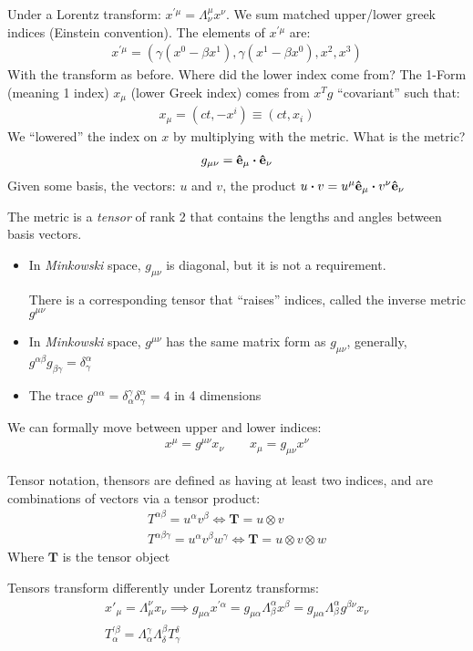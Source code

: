 Under a Lorentz transform: $x^{\prime\mu}=\Lambda^\mu_\nu x^\nu$. We sum matched upper/lower greek indices (Einstein convention). The elements of $x^{\prime\mu}$ are:
\begin{align*}
  x^{\prime\mu}=(\gamma(x^0-\beta x^1),\gamma(x^1-\beta x^0),x^2,x^3)
\end{align*}
With the transform as before. Where did the lower index come from? The 1-Form (meaning 1 index) $x_\mu$ (lower Greek index) comes from $x^Tg$ ``covariant'' such that:
\begin{align*}
  x_\mu=(ct,-x^i)\equiv (ct,x_i)
\end{align*}
We ``lowered'' the index on $x$ by multiplying with the metric. What is the metric?
\begin{align*}
  g_{\mu\nu}=\vu{e}_\mu\vdot\vu{e}_\nu
\end{align*}
Given some basis, the vectors: $u$ and $v$, the product $u\vdot v=u^\mu\vu{e}_\mu\vdot v^\nu\vu{e}_\nu$

\begin{definition}
  The metric is a \emph{tensor} of rank 2 that contains the lengths and angles between basis vectors.
  \begin{itemize}
  \item In \emph{Minkowski} space, $g_{\mu\nu}$ is diagonal, but it is not a requirement.

    There is a corresponding tensor that ``raises'' indices, called the inverse metric $g^{\mu\nu}$
  \item In \emph{Minkowski} space, $g^{\mu\nu}$ has the same matrix form as $g_{\mu\nu}$, generally, $g^{\alpha\beta}g_{\beta\gamma}=\delta^{\alpha}_\gamma$
  \item The trace $g^{\alpha\alpha}=\delta^\gamma_\alpha\delta^\alpha_\gamma=4$ in 4 dimensions
  \end{itemize}
\end{definition}
We can formally move between upper and lower indices:
\begin{align*}
  x^\mu=g^{\mu\nu}x_\nu\qquad x_\mu=g_{\mu\nu}x^\nu
\end{align*}
\begin{note}
  Tensor notation, thensors are defined as having at least two indices, and are combinations of vectors via a tensor product:
  \begin{gather*}
    T^{\alpha\beta}=u^\alpha v^\beta\iff \bm{T}=u\otimes v\\
    T^{\alpha\beta\gamma}=u^\alpha v^\beta w^\gamma\iff \bm{T}=u\otimes v\otimes w
  \end{gather*}
  Where $\bm{T}$ is the tensor object
\end{note}
Tensors transform differently under Lorentz transforms:
\begin{gather*}
  x'_\mu=\Lambda_\mu^\nu x_\nu\implies
  g_{\mu\alpha}x^{\prime\alpha}=g_{\mu\alpha}\Lambda^\alpha_\beta x^\beta
  =g_{\mu\alpha}\Lambda^\alpha_\beta g^{\beta\nu}x_\nu\\
  T^{\prime\beta}_\alpha=\Lambda_\alpha^\gamma\Lambda_\delta^\beta T_\gamma^\delta
\end{gather*}

